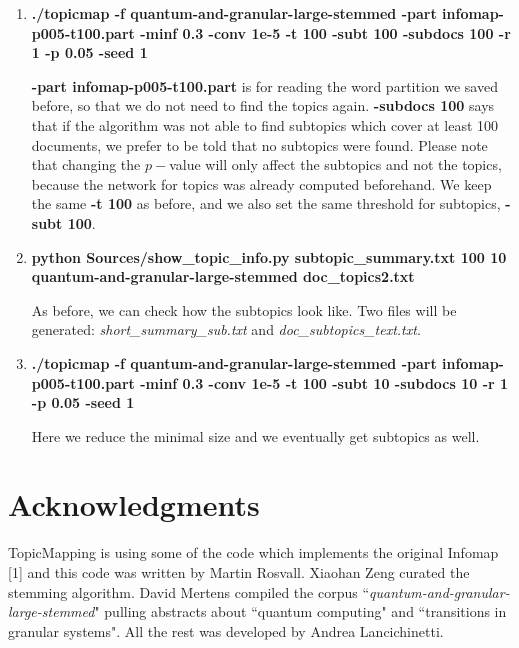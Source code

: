 \documentclass[11pt]{article}
\begin{document}
\begin{enumerate}

\item \textbf{./topicmap -f quantum-and-granular-large-stemmed -part infomap-p005-t100.part -minf 0.3 -conv 1e-5 -t 100 -subt 100 -subdocs 100 -r 1 -p 0.05 -seed 1}

\small{
\textbf{-part infomap-p005-t100.part} is for reading the word partition we saved before, so that we do not need to find the topics again. \textbf{-subdocs 100} says that if the algorithm was not able to find subtopics which cover at least 100 documents, we prefer to be told that no subtopics were found. Please note that changing the $p-$value will only affect the subtopics and not the topics,  because the network for topics was already computed beforehand. We keep the same \textbf{-t 100} as before, and we also set the same threshold for subtopics, \textbf{-subt 100}.
}\normalsize{}



\item \textbf{python Sources/show\_topic\_info.py subtopic\_summary.txt 100 10 quantum-and-granular-large-stemmed doc\_topics2.txt}

\small{
As before, we can check how the subtopics look like. Two files will be generated: \textit{short\_summary\_sub.txt} and   \textit{doc\_subtopics\_text.txt}.
}\normalsize{}

\item \textbf{./topicmap -f quantum-and-granular-large-stemmed -part infomap-p005-t100.part -minf 0.3 -conv 1e-5 -t 100 -subt 10 -subdocs 10 -r 1 -p 0.05 -seed 1}

\small{
Here we reduce the minimal size and we eventually get subtopics as well. 
}\normalsize{}


\end{enumerate}


\section{Acknowledgments}

TopicMapping is using some of the code which implements the original Infomap [1] and this code was written by Martin Rosvall.
Xiaohan Zeng curated the stemming algorithm. David Mertens compiled the corpus ``\textit{quantum-and-granular-large-stemmed}" pulling abstracts about ``quantum computing" and ``transitions in granular systems". 
All the rest was developed by Andrea Lancichinetti.

%
%
%
%
%
%
\end{document}
